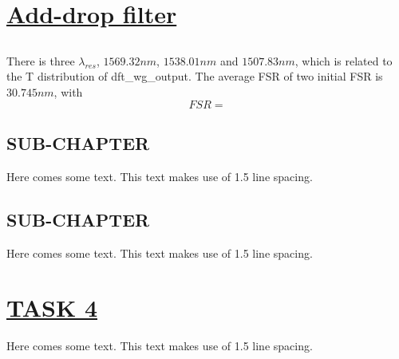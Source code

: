 \documentclass[fontsize=11pt]{scrartcl}
\begin{document}
\section{\uline{Add-drop filter}}
\subsection{}
There is three $\lambda_{res}$, $1569.32nm$, $1538.01nm$ and $1507.83nm$, which is related to 
the T distribution of dft\_wg\_output. The average FSR of two initial FSR is $30.745nm$, with 
\begin{equation} 
    FSR =  
    \label{eq3}
\end{equation}
\subsection{SUB-CHAPTER}
Here comes some text. This text makes use of 1.5 line spacing. 
\subsection{SUB-CHAPTER}
Here comes some text. This text makes use of 1.5 line spacing. 
\pagebreak
\section{\uline{TASK 4}}
Here comes some text. This text makes use of 1.5 line spacing. 
\end{document}
